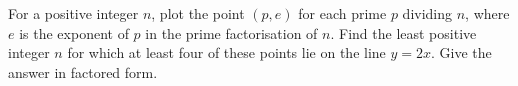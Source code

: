 For a positive integer $n$, plot the point $(p,e)$ for each prime $p$ dividing $n$, where $e$ is the exponent of $p$ in the prime factorisation of $n$. Find the least positive integer $n$ for which at least four of these points lie on the line $y=2x$. Give the answer in factored form.
